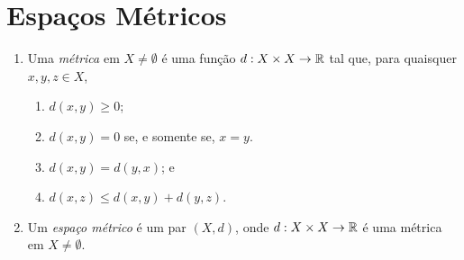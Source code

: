 
\chapter{Espaços Métricos}

\begin{definition}
    \leavevmode
        \begin{enumerate}[leftmargin=*, align=left, label=\textbf{(\alph*)}]
            \item Uma \emph{métrica} em $X \neq \emptyset$ é uma função $d : X \times X \to \mathbb{R}$ tal que, para quaisquer $x,y,z \in X$,
                \begin{enumerate}
                    \item $d(x,y) \geq 0$;
                    \item $d(x,y) = 0$ se, e somente se, $x=y$.
                    \item $d(x,y) = d(y,x)$; e
                    \item $d(x,z) \leq d(x,y) + d(y,z)$.
                \end{enumerate}
            \item Um \emph{espaço métrico} é um par $(X,d)$, onde $d : X \times X \to \mathbb{R}$ é uma métrica em $X \neq \emptyset$.
        \end{enumerate}
\end{definition}